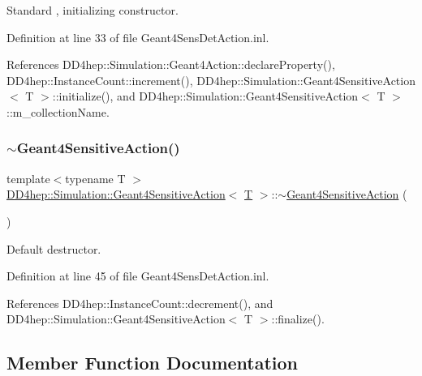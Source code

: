 Standard , initializing constructor. 



Definition at line 33 of file Geant4\+Sens\+Det\+Action.\+inl.



References D\+D4hep\+::\+Simulation\+::\+Geant4\+Action\+::declare\+Property(), D\+D4hep\+::\+Instance\+Count\+::increment(), D\+D4hep\+::\+Simulation\+::\+Geant4\+Sensitive\+Action$<$ T $>$\+::initialize(), and D\+D4hep\+::\+Simulation\+::\+Geant4\+Sensitive\+Action$<$ T $>$\+::m\+\_\+collection\+Name.

\hypertarget{class_d_d4hep_1_1_simulation_1_1_geant4_sensitive_action_a2f233b92d70c7303055662c753063c7f}{}\label{class_d_d4hep_1_1_simulation_1_1_geant4_sensitive_action_a2f233b92d70c7303055662c753063c7f} 
\subsubsection{\texorpdfstring{$\sim$\+Geant4\+Sensitive\+Action()}{~Geant4SensitiveAction()}}
{\footnotesize\ttfamily template$<$typename T $>$ \\
\hyperlink{class_d_d4hep_1_1_simulation_1_1_geant4_sensitive_action}{D\+D4hep\+::\+Simulation\+::\+Geant4\+Sensitive\+Action}$<$ \hyperlink{class_t}{T} $>$\+::$\sim$\hyperlink{class_d_d4hep_1_1_simulation_1_1_geant4_sensitive_action}{Geant4\+Sensitive\+Action} (\begin{DoxyParamCaption}{ }\end{DoxyParamCaption})\hspace{0.3cm}{\ttfamily [virtual]}}



Default destructor. 



Definition at line 45 of file Geant4\+Sens\+Det\+Action.\+inl.



References D\+D4hep\+::\+Instance\+Count\+::decrement(), and D\+D4hep\+::\+Simulation\+::\+Geant4\+Sensitive\+Action$<$ T $>$\+::finalize().



\subsection{Member Function Documentation}
\hypertarget{class_d_d4hep_1_1_simulation_1_1_geant4_sensitive_action_a601b872018378ba77a1573f4458b61e1}{}\label{class_d_d4hep_1_1_simulation_1_1_geant4_sensitive_action_a601b872018378ba77a1573f4458b61e1} 
